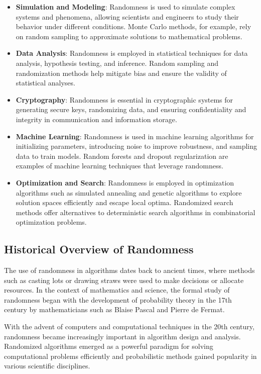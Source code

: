 \documentclass[12pt]{book} %
\begin{document}
\begin{itemize}
    \item \textbf{Simulation and Modeling}: Randomness is used to simulate complex systems and phenomena, allowing scientists and engineers to study their behavior under different conditions. Monte Carlo methods, for example, rely on random sampling to approximate solutions to mathematical problems.
    
    \item \textbf{Data Analysis}: Randomness is employed in statistical techniques for data analysis, hypothesis testing, and inference. Random sampling and randomization methods help mitigate bias and ensure the validity of statistical analyses.
    
    \item \textbf{Cryptography}: Randomness is essential in cryptographic systems for generating secure keys, randomizing data, and ensuring confidentiality and integrity in communication and information storage.
    
    \item \textbf{Machine Learning}: Randomness is used in machine learning algorithms for initializing parameters, introducing noise to improve robustness, and sampling data to train models. Random forests and dropout regularization are examples of machine learning techniques that leverage randomness.
    
    \item \textbf{Optimization and Search}: Randomness is employed in optimization algorithms such as simulated annealing and genetic algorithms to explore solution spaces efficiently and escape local optima. Randomized search methods offer alternatives to deterministic search algorithms in combinatorial optimization problems.
\end{itemize}

\subsection{Historical Overview of Randomness}

The use of randomness in algorithms dates back to ancient times, where methods such as casting lots or drawing straws were used to make decisions or allocate resources. In the context of mathematics and science, the formal study of randomness began with the development of probability theory in the 17th century by mathematicians such as Blaise Pascal and Pierre de Fermat.

With the advent of computers and computational techniques in the 20th century, randomness became increasingly important in algorithm design and analysis. Randomized algorithms emerged as a powerful paradigm for solving computational problems efficiently and probabilistic methods gained popularity in various scientific disciplines.
\end{document}
